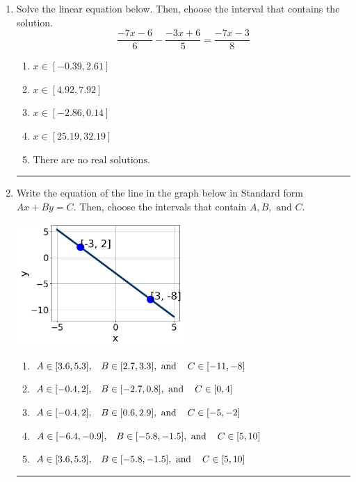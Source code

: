 \documentclass[14pt]{extbook}
\newcommand{\litem}[1]{\item#1\hspace*{-1cm}\rule{\textwidth}{0.4pt}}
\begin{document}
\begin{enumerate}
{\begin{enumerate}[label=\Alph*.]
\end{enumerate} }
\litem{
Solve the linear equation below. Then, choose the interval that contains the solution.\[ \frac{-7x -6}{6} - \frac{-3x + 6}{5} = \frac{-7x -3}{8} \]\begin{enumerate}[label=\Alph*.]
\item \( x \in [-0.39, 2.61] \)
\item \( x \in [4.92, 7.92] \)
\item \( x \in [-2.86, 0.14] \)
\item \( x \in [25.19, 32.19] \)
\item \( \text{There are no real solutions.} \)

\end{enumerate} }
\litem{
Write the equation of the line in the graph below in Standard form $Ax+By=C$. Then, choose the intervals that contain $A, B, \text{ and } C$.
\begin{center}
    \includegraphics[width=0.5\textwidth]{../Figures/linearGraphToStandardC.png}
\end{center}
\begin{enumerate}[label=\Alph*.]
\item \( A \in [3.6, 5.3], \hspace{3mm} B \in [2.7, 3.3], \text{ and } \hspace{3mm} C \in [-11, -8] \)
\item \( A \in [-0.4, 2], \hspace{3mm} B \in [-2.7, 0.8], \text{ and } \hspace{3mm} C \in [0, 4] \)
\item \( A \in [-0.4, 2], \hspace{3mm} B \in [0.6, 2.9], \text{ and } \hspace{3mm} C \in [-5, -2] \)
\item \( A \in [-6.4, -0.9], \hspace{3mm} B \in [-5.8, -1.5], \text{ and } \hspace{3mm} C \in [5, 10] \)
\item \( A \in [3.6, 5.3], \hspace{3mm} B \in [-5.8, -1.5], \text{ and } \hspace{3mm} C \in [5, 10] \)


\end{enumerate}}
\end{enumerate}
\end{document}
